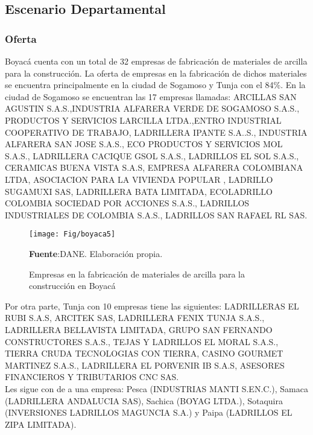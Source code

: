 \documentclass[12pt]{article}
\begin{document}
\subsection{Escenario Departamental}
\subsubsection{Oferta}
Boyacá cuenta con un total de 32 empresas de fabricación  de materiales de arcilla para la construcción. 
La oferta de empresas en la fabricación de dichos materiales se encuentra principalmente en la ciudad de Sogamoso y Tunja con el 84\%.
En la ciudad de Sogamoso se encuentran las 17 empresas llamadas: ARCILLAS SAN AGUSTIN S.A.S.,INDUSTRIA ALFARERA VERDE DE SOGAMOSO S.A.S., PRODUCTOS Y SERVICIOS LARCILLA LTDA.,ENTRO INDUSTRIAL COOPERATIVO DE TRABAJO, LADRILLERA IPANTE S.A..S., INDUSTRIA ALFARERA SAN JOSE S.A.S., 	ECO PRODUCTOS Y SERVICIOS MOL S.A.S., LADRILLERA CACIQUE GSOL S.A.S., LADRILLOS EL SOL S.A.S., CERAMICAS BUENA VISTA S.A.S, 	EMPRESA ALFARERA COLOMBIANA LTDA, ASOCIACION PARA LA VIVIENDA POPULAR , 	LADRILLO SUGAMUXI SAS, 	LADRILLERA BATA LIMITADA, 	ECOLADRILLO COLOMBIA SOCIEDAD POR ACCIONES S.A.S., 	LADRILLOS INDUSTRIALES DE COLOMBIA S.A.S., LADRILLOS SAN RAFAEL RL SAS. 
	\begin{figure}[H]
  	\centering 		
  	\caption{Empresas en la fabricación  de materiales de arcilla para la construcción en Boyacá}
	\texttt{[image: Fig/boyaca5]}
\raggedright  \scriptsize \textbf{Fuente}:DANE. Elaboración propia.
	\label{A2}	
	\end{figure}
	Por otra parte, Tunja con 10 empresas tiene las siguientes: LADRILLERAS EL RUBI S.A.S, 	ARCITEK SAS, 	LADRILLERA FENIX TUNJA S.A.S., 	LADRILLERA BELLAVISTA LIMITADA, 	GRUPO SAN FERNANDO CONSTRUCTORES S.A.S., TEJAS Y LADRILLOS EL MORAL S.A.S., TIERRA CRUDA TECNOLOGIAS CON TIERRA, CASINO GOURMET MARTINEZ S.A.S., LADRILLERA EL PORVENIR IB S.A.S, ASESORES FINANCIEROS Y TRIBUTARIOS CNC SAS.\\

Les sigue con de a una empresa: Pesca (INDUSTRIAS MANTI S.EN.C.), Samaca (LADRILLERA ANDALUCIA SAS), Sachica (BOYAG LTDA.), Sotaquira	(INVERSIONES LADRILLOS MAGUNCIA S.A.) y Paipa (LADRILLOS EL ZIPA LIMITADA).
	
\end{document}
